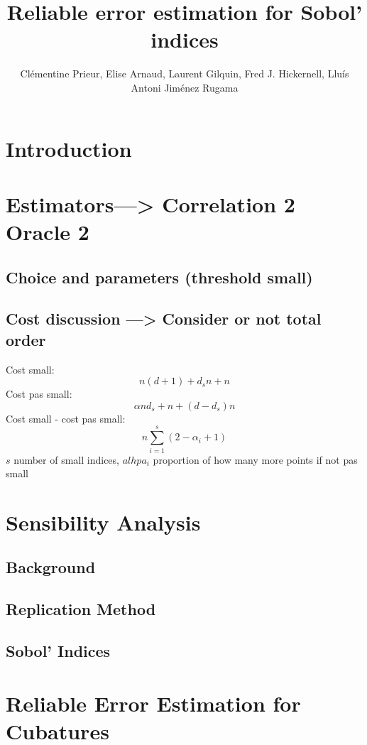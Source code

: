 \documentclass[]{elsarticle}
\theoremstyle{definition}
\begin{document}
\begin{frontmatter}

\title{Reliable error estimation for Sobol' indices}

\author{Cl\'ementine Prieur, Elise Arnaud, Laurent Gilquin, Fred J. Hickernell, Llu\'{i}s Antoni Jim\'{e}nez Rugama}
\address{U. Josef Fourier, Illinois Institute of Technology}
\begin{abstract}
\end{abstract}

\end{frontmatter}

\section{Introduction}

\section{Estimators---> Correlation 2 Oracle 2}
\subsection{Choice and parameters (threshold small)}
\subsection{Cost discussion ---> Consider or not total order}
Cost small:\[n(d+1)+d_sn+n\]
Cost pas small:\[\alpha n d_s +n+(d-d_s)n\]
Cost small - cost pas small: \[n\sum_{i=1}^{s}(2-\alpha_i+1)\] $s$ number of small indices, $alhpa_i$ proportion of how many more points if not pas small

\section{Sensibility Analysis}
\subsection{Background}
\subsection{Replication Method}
\subsection{Sobol' Indices}

\section{Reliable Error Estimation for Cubatures}
\end{document}
